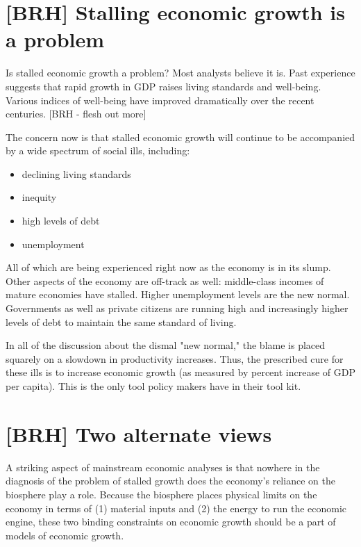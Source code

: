 \section{[BRH] Stalling economic growth is a problem}
\label{sec:stall_is_a_problem}
Is stalled economic growth a problem? Most analysts believe it is. Past experience suggests that rapid growth in GDP raises living standards and well-being. Various indices of well-being have improved dramatically over the recent centuries. [BRH - flesh out more]

The concern now is that stalled economic growth will continue to be accompanied by a wide spectrum of social ills, including:
\begin{itemize}
	\item{declining living standards}
	\item{inequity}
	\item{high levels of debt}
	\item{unemployment}
\end{itemize}

All of which are being experienced right now as the economy is in its slump. Other aspects of the economy are off-track as well: middle-class incomes of mature economies have stalled. Higher unemployment levels are the new normal. Governments as well as private citizens are running high and increasingly higher levels of debt to maintain the same standard of living.

In all of the discussion about the dismal "new normal," the blame is placed squarely on a slowdown in productivity increases. Thus, the prescribed cure for these ills is to increase economic growth (as measured by percent increase of GDP per capita). This is the only tool policy makers have in their tool kit.

\section{[BRH] Two alternate views}
\label{sec:stall_is_a_problem}
A striking aspect of mainstream economic analyses is that nowhere in the diagnosis of the problem of stalled growth does the economy's reliance on the biosphere play a role. Because the biosphere places physical limits on the economy in terms of (1) material inputs and (2) the energy to run the economic engine, these two binding constraints on economic growth should be a part of models of economic growth. 

